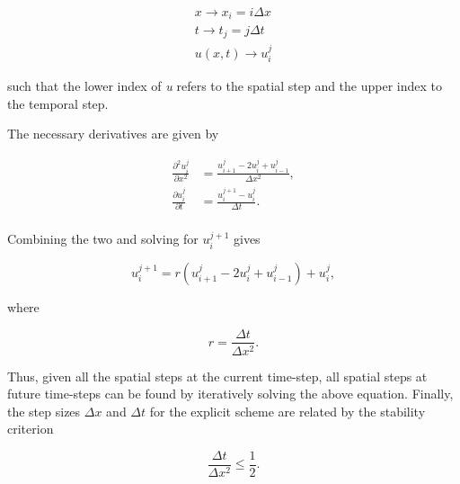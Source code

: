 \documentclass[multicolumn, 9pt]{extarticle}
\begin{document}
\begin{align*}
	x \rightarrow x_{i} = i\Delta x  \\
	t \rightarrow t_{j} = j \Delta t \\
	u(x, t)  \rightarrow u_{i}^{j}
\end{align*}

such that the lower index of \textit{u} refers to the spatial step and the upper index to the temporal step.

The necessary derivatives are given by

\begin{align*}
	\frac{\partial^2u_i^j}{\partial x^2} & = \frac{u_{i+1}^{j} - 2u_{i}^{j} + u_{i-1}^{j}}{\Delta x^{2}}, \\
	\frac{\partial u_i^j}{\partial t}    & = \frac{u_{i}^{j+1} - u_{i}^{j}}{\Delta t}.                    \\
\end{align*}

Combining the two and solving for $u_{i}^{j+1}$ gives

\begin{equation}\label{eq:euler}
	u_{i}^{j+1} = r(u_{i+1}^{j} - 2u_{i}^{j} + u_{i-1}^{j}) + u_{i}^{j},
\end{equation}

where

\begin{equation*}
	r = \frac{\Delta t}{\Delta x^{2}}.
\end{equation*}

Thus, given all the spatial steps at the current time-step, all spatial steps at future time-steps can be found by iteratively solving the above equation. Finally, the step sizes $\Delta x$ and $\Delta t$ for the explicit scheme are related by the stability criterion

\begin{equation}\label{eq:stability_crit}
	\frac{\Delta t}{\Delta x^{2}} \le \frac{1}{2}.
\end{equation}
\end{document}
